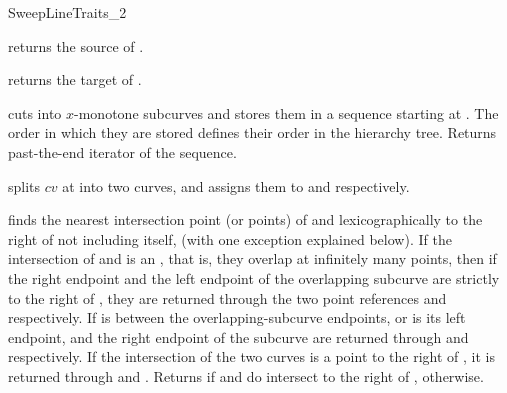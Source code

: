 \begin{ccRefConcept}{SweepLineTraits_2}

         {returns the source of .}

             {returns the target of .}

	 {cuts  into $x$-monotone subcurves and stores them in a
	   sequence starting at . The order in which they are stored
	   defines their order in the hierarchy tree. Returns past-the-end
	   iterator of the sequence.}

         {splits $cv$ at  into two curves, and assigns them to
            and  respectively.
           }

	 {finds the nearest intersection point (or points) of  and
	    lexicographically to the right of  not including
	    itself, (with one exception explained below).
	   If the intersection of  and  is an
	   , that is, they overlap at infinitely many
	   points, then if the right endpoint and the left endpoint of the
	   overlapping subcurve are strictly to the right of , they are
	   returned through the two point references  and 
	   respectively. If  is between the overlapping-subcurve
	   endpoints, or  is its left endpoint,  and the right
	   endpoint of the subcurve are returned through  and 
	   respectively. If the intersection of the two curves is a point to the
	   right of , it is returned through  and .
	   Returns  if  and  do intersect to the right
	   of ,  otherwise.}


\end{ccRefConcept}
